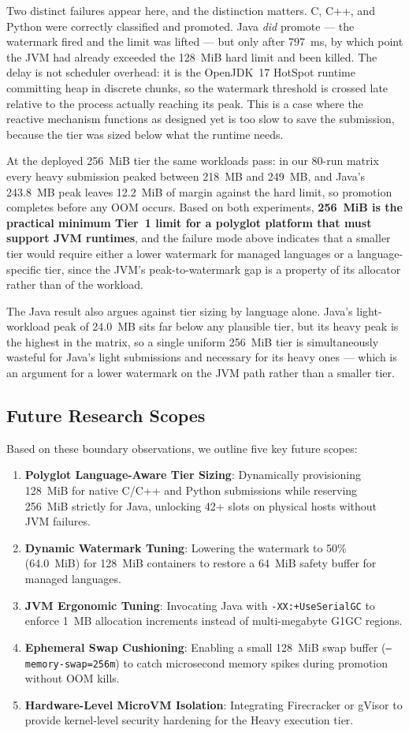\documentclass[conference]{IEEEtran}
\begin{document}
Two distinct failures appear here, and the distinction matters. C, C++, and Python were correctly classified and promoted. Java \emph{did} promote --- the watermark fired and the limit was lifted --- but only after 797~ms, by which point the JVM had already exceeded the 128~MiB hard limit and been killed. The delay is not scheduler overhead: it is the OpenJDK~17 HotSpot runtime committing heap in discrete chunks, so the watermark threshold is crossed late relative to the process actually reaching its peak. This is a case where the reactive mechanism functions as designed yet is too slow to save the submission, because the tier was sized below what the runtime needs.

At the deployed 256~MiB tier the same workloads pass: in our 80-run matrix every heavy submission peaked between 218~MB and 249~MB, and Java's 243.8~MB peak leaves 12.2~MiB of margin against the hard limit, so promotion completes before any OOM occurs. Based on both experiments, \textbf{256~MiB is the practical minimum Tier~1 limit for a polyglot platform that must support JVM runtimes}, and the failure mode above indicates that a smaller tier would require either a lower watermark for managed languages or a language-specific tier, since the JVM's peak-to-watermark gap is a property of its allocator rather than of the workload.

The Java result also argues against tier sizing by language alone. Java's light-workload peak of 24.0~MB sits far below any plausible tier, but its heavy peak is the highest in the matrix, so a single uniform 256~MiB tier is simultaneously wasteful for Java's light submissions and necessary for its heavy ones --- which is an argument for a lower watermark on the JVM path rather than a smaller tier.


\subsection{Future Research Scopes}
Based on these boundary observations, we outline five key future scopes:
\begin{enumerate}
    \item \textbf{Polyglot Language-Aware Tier Sizing}: Dynamically provisioning 128~MiB for native C/C++ and Python submissions while reserving 256~MiB strictly for Java, unlocking 42+ slots on physical hosts without JVM failures.
    \item \textbf{Dynamic Watermark Tuning}: Lowering the watermark to 50\% (64.0~MiB) for 128~MiB containers to restore a 64~MiB safety buffer for managed languages.
    \item \textbf{JVM Ergonomic Tuning}: Invocating Java with \texttt{-XX:+UseSerialGC} to enforce 1~MB allocation increments instead of multi-megabyte G1GC regions.
    \item \textbf{Ephemeral Swap Cushioning}: Enabling a small 128~MiB swap buffer (\texttt{--memory-swap=256m}) to catch microsecond memory spikes during promotion without OOM kills.
    \item \textbf{Hardware-Level MicroVM Isolation}: Integrating Firecracker or gVisor to provide kernel-level security hardening for the Heavy execution tier.
\end{enumerate}
\end{document}

